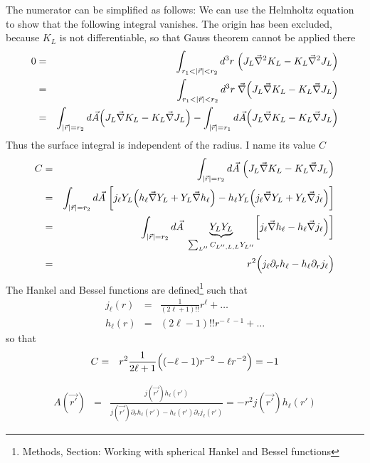 \documentclass[11pt,a4paper]{report}
\begin{document}
The numerator can be simplified as follows: We can use the Helmholtz
equation to show that the following integral vanishes. The origin has
been excluded, because $K_L$ is not differentiable, so that Gauss
theorem cannot be applied there
\begin{eqnarray}
0&=&\int_{r_1<|\vec{r}|<r_2} d^3r\; 
\Bigl(J_L\vec{\nabla}^2 K_L-K_L\vec{\nabla}^2 J_L\Bigr)
\nonumber\\
%
%
&=&\int_{r_1<|\vec{r}|<r_2} d^3r\; 
\vec{\nabla}\Bigl(J_L\vec{\nabla} K_L-K_L\vec{\nabla} J_L\Bigr)
\nonumber\\
%
%
&=&
\int_{|\vec{r}|=r_2} d\vec{A}
\Bigl(J_L\vec{\nabla} K_L-K_L\vec{\nabla} J_L\Bigr)
-\int_{|\vec{r}|=r_1} d\vec{A}
\Bigl(J_L\vec{\nabla} K_L-K_L\vec{\nabla} J_L\Bigr)
\end{eqnarray}
Thus the surface integral is independent of the radius. I name its
value $C$
\begin{eqnarray}
C&=&\int_{|\vec{r}|=r_2} d\vec{A}\;\Bigl(J_L\vec{\nabla} K_L-K_L\vec{\nabla} J_L\Bigr)
\nonumber\\
%
&=&\int_{|\vec{r}|=r_2} d\vec{A}\;\biggl[
j_\ell Y_L\Bigl(h_\ell \vec{\nabla}Y_L+Y_L \vec{\nabla}h_\ell\Bigr) 
-
h_\ell Y_L\Bigl(j_\ell \vec{\nabla}Y_L+Y_L \vec{\nabla}j_\ell\Bigr) 
\biggr]
\nonumber\\
%
&=&\int_{|\vec{r}|=r_2} d\vec{A}\;
\underbrace{Y_LY_L}_{\sum_{L''}C_{L'',L,L}Y_{L''}}
\biggl[
 j_\ell \vec{\nabla}h_\ell-h_\ell  \vec{\nabla}j_\ell\Bigr) 
\biggr]
\nonumber\\
%
&=&r^2\Bigl( j_\ell \partial_rh_\ell-h_\ell\partial_rj_\ell\Bigr) 
\end{eqnarray}
The Hankel and Bessel functions are defined\footnote{Methods, Section:
  Working with spherical Hankel and Bessel functions} such that
\begin{eqnarray}
j_\ell(r)&=&\frac{1}{(2\ell+1)!!}r^\ell+\ldots
\nonumber\\
h_\ell(r)&=&(2\ell-1)!!r^{-\ell-1}+\ldots
\end{eqnarray}
so that
\begin{eqnarray}
C
&=&r^2
\frac{1}{2\ell+1}\Bigl((-\ell-1)r^{-2}-\ell r^{-2}\Bigr)
=-1
\end{eqnarray}

\begin{eqnarray}
A(\vec{r'})&=&
\frac{j(\vec{r'})h_\ell(r')}{j(\vec{r'})\partial_rh_\ell(r')
-h_\ell(r')\partial_r j_\ell(r')}
=-r^2 j(\vec{r'})h_\ell(r')
\end{eqnarray}
\end{document}
